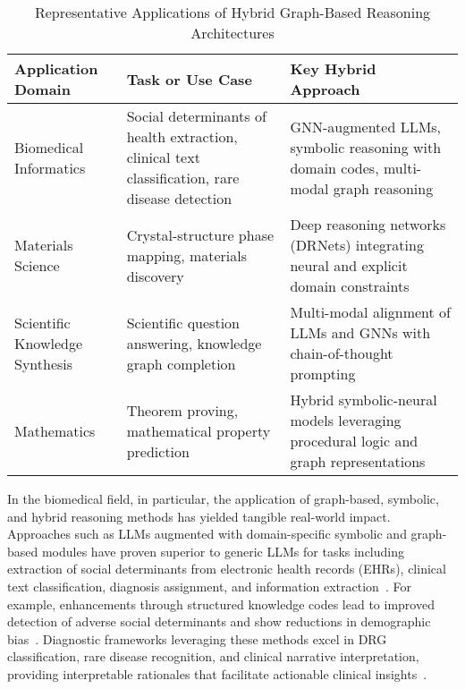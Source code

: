 \documentclass[sigconf]{acmart}
\begin{document}
\begin{table*}[htbp]
\centering
\caption{Representative Applications of Hybrid Graph-Based Reasoning Architectures}
\label{tab:domain_applications}
\begin{adjustbox}{max width=\textwidth}
\begin{tabular}{lll}
\toprule
\textbf{Application Domain} & \textbf{Task or Use Case} & \textbf{Key Hybrid Approach} \\
\midrule
Biomedical Informatics & Social determinants of health extraction, clinical text classification, rare disease detection & GNN-augmented LLMs, symbolic reasoning with domain codes, multi-modal graph reasoning \\
Materials Science & Crystal-structure phase mapping, materials discovery & Deep reasoning networks (DRNets) integrating neural and explicit domain constraints \\
Scientific Knowledge Synthesis & Scientific question answering, knowledge graph completion & Multi-modal alignment of LLMs and GNNs with chain-of-thought prompting \\
Mathematics & Theorem proving, mathematical property prediction & Hybrid symbolic-neural models leveraging procedural logic and graph representations \\
\bottomrule
\end{tabular}
\end{adjustbox}
\end{table*}

In the biomedical field, in particular, the application of graph-based, symbolic, and hybrid reasoning methods has yielded tangible real-world impact. Approaches such as LLMs augmented with domain-specific symbolic and graph-based modules have proven superior to generic LLMs for tasks including extraction of social determinants from electronic health records (EHRs), clinical text classification, diagnosis assignment, and information extraction~\cite{ref1,ref2,ref3,ref4,ref5,ref15,ref18,ref19,ref36,ref43,ref45,ref47,ref49,ref50,ref53,ref55,ref61,ref62,ref89,ref94,ref95}. For example, enhancements through structured knowledge codes lead to improved detection of adverse social determinants and show reductions in demographic bias~\cite{ref1,ref2,ref53,ref61}. Diagnostic frameworks leveraging these methods excel in DRG classification, rare disease recognition, and clinical narrative interpretation, providing interpretable rationales that facilitate actionable clinical insights~\cite{ref4,ref5,ref36,ref43,ref45,ref47,ref50,ref53,ref62,ref94,ref95}.
\end{document}
